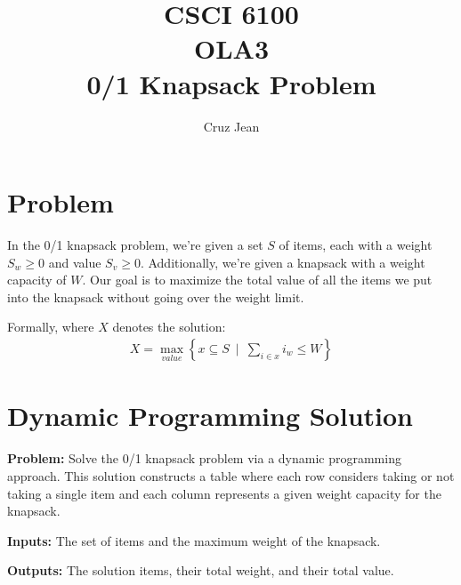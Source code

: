 \documentclass{article}
\begin{document}
\title{CSCI 6100 \protect\\ OLA3 \protect\\ 0/1 Knapsack Problem}
\author{Cruz Jean}
\maketitle

\section{Problem}
In the 0/1 knapsack problem, we're given a set $S$ of items, each with a weight $S_w \ge 0$ and value $S_v \ge 0$.
Additionally, we're given a knapsack with a weight capacity of $W$.
Our goal is to maximize the total value of all the items we put into the knapsack without going over the weight limit.

Formally, where $X$ denotes the solution:
\begin{align}
X = \max_{value} \left\{x \subseteq S \enspace \bigg| \enspace \sum_{i \in x}{i_w} \leq W\right\}
\end{align}

\pagebreak
\section{Dynamic Programming Solution}

\textbf{Problem:}
Solve the 0/1 knapsack problem via a dynamic programming approach.
This solution constructs a table where each row considers taking or not taking a single item and each column represents a given weight capacity for the knapsack.

\textbf{Inputs:} The set of items and the maximum weight of the knapsack.

\textbf{Outputs:} The solution items, their total weight, and their total value.
\end{document}
